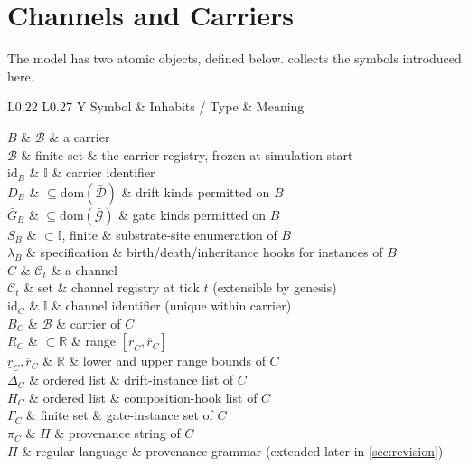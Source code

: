 \documentclass[journal,onecolumn,11pt]{IEEEtran}
\theoremstyle{definition}
\newcommand{\notationtable}[3]{%
  \begin{table}[ht]
  \centering
  \caption{#1}
  \label{#2}
  \small
  \renewcommand{\arraystretch}{1.1}
  \begin{tabularx}{\linewidth}{L{0.22\linewidth} L{0.27\linewidth} Y}
  \toprule
  Symbol & Inhabits / Type & Meaning \\
  \midrule
  #3
  \bottomrule
  \end{tabularx}
  \end{table}%
}
\begin{document}
\section{Channels and Carriers}
\label{sec:channels}

The model has two atomic objects, defined below.  collects the symbols introduced here.

\notationtable{Symbols introduced in \cref{sec:channels}.}{tab:notation-channels}{
$B$                       & $\mathcal{B}$                & a carrier \\
$\mathcal{B}$             & finite set                   & the carrier registry, frozen at simulation start \\
$\mathrm{id}_B$           & $\mathbb{I}$                 & carrier identifier \\
$\bar{D}_B$               & $\subseteq \mathrm{dom}(\bar{\mathcal{D}})$ & drift kinds permitted on $B$ \\
$\bar{G}_B$               & $\subseteq \mathrm{dom}(\bar{\mathcal{G}})$ & gate kinds permitted on $B$ \\
$S_B$                     & $\subset \mathbb{I}$, finite & substrate-site enumeration of $B$ \\
$\lambda_B$               & specification                & birth/death/inheritance hooks for instances of $B$ \\
$C$                       & $\mathcal{C}_t$              & a channel \\
$\mathcal{C}_t$           & set                          & channel registry at tick $t$ (extensible by genesis) \\
$\mathrm{id}_C$           & $\mathbb{I}$                 & channel identifier (unique within carrier) \\
$B_C$                     & $\mathcal{B}$                & carrier of $C$ \\
$R_C$                     & $\subset \mathbb{R}$         & range $[\underline{r}_C, \overline{r}_C]$ \\
$\underline{r}_C, \overline{r}_C$ & $\mathbb{R}$         & lower and upper range bounds of $C$ \\
$\Delta_C$                & ordered list                 & drift-instance list of $C$ \\
$H_C$                     & ordered list                 & composition-hook list of $C$ \\
$\Gamma_C$                & finite set                   & gate-instance set of $C$ \\
$\pi_C$                   & $\Pi$                        & provenance string of $C$ \\
$\Pi$                     & regular language             & provenance grammar (extended later in \cref{sec:revision}) \\
}
\end{document}
